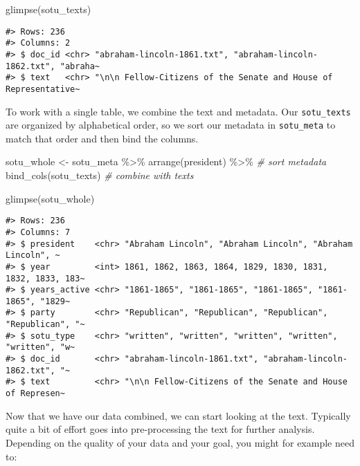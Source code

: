\documentclass[
]{book}
\newenvironment{Shaded}{\begin{snugshade}}{\end{snugshade}}
\newcommand{\CommentTok}[1]{\textcolor[rgb]{0.56,0.35,0.01}{\textit{#1}}}
\newcommand{\FunctionTok}[1]{\textcolor[rgb]{0.00,0.00,0.00}{#1}}
\newcommand{\NormalTok}[1]{#1}
\newcommand{\OtherTok}[1]{\textcolor[rgb]{0.56,0.35,0.01}{#1}}
\newcommand{\SpecialCharTok}[1]{\textcolor[rgb]{0.00,0.00,0.00}{#1}}
\begin{document}
\begin{Shaded}
\begin{Highlighting}[]
\FunctionTok{glimpse}\NormalTok{(sotu\_texts)}
\end{Highlighting}
\end{Shaded}

\begin{verbatim}
#> Rows: 236
#> Columns: 2
#> $ doc_id <chr> "abraham-lincoln-1861.txt", "abraham-lincoln-1862.txt", "abraha~
#> $ text   <chr> "\n\n Fellow-Citizens of the Senate and House of Representative~
\end{verbatim}

To work with a single table, we combine the text and metadata. Our \texttt{sotu\_texts} are organized by alphabetical order, so we sort our metadata in \texttt{sotu\_meta} to match that order and then bind the columns.

\begin{Shaded}
\begin{Highlighting}[]
\NormalTok{sotu\_whole }\OtherTok{\textless{}{-}} 
\NormalTok{  sotu\_meta }\SpecialCharTok{\%\textgreater{}\%}  
  \FunctionTok{arrange}\NormalTok{(president) }\SpecialCharTok{\%\textgreater{}\%} \CommentTok{\# sort metadata}
  \FunctionTok{bind\_cols}\NormalTok{(sotu\_texts) }\CommentTok{\# combine with texts}

\FunctionTok{glimpse}\NormalTok{(sotu\_whole)}
\end{Highlighting}
\end{Shaded}

\begin{verbatim}
#> Rows: 236
#> Columns: 7
#> $ president    <chr> "Abraham Lincoln", "Abraham Lincoln", "Abraham Lincoln", ~
#> $ year         <int> 1861, 1862, 1863, 1864, 1829, 1830, 1831, 1832, 1833, 183~
#> $ years_active <chr> "1861-1865", "1861-1865", "1861-1865", "1861-1865", "1829~
#> $ party        <chr> "Republican", "Republican", "Republican", "Republican", "~
#> $ sotu_type    <chr> "written", "written", "written", "written", "written", "w~
#> $ doc_id       <chr> "abraham-lincoln-1861.txt", "abraham-lincoln-1862.txt", "~
#> $ text         <chr> "\n\n Fellow-Citizens of the Senate and House of Represen~
\end{verbatim}

Now that we have our data combined, we can start looking at the text. Typically quite a bit of effort goes into pre-processing the text for further analysis. Depending on the quality of your data and your goal, you might for example need to:
\end{document}
